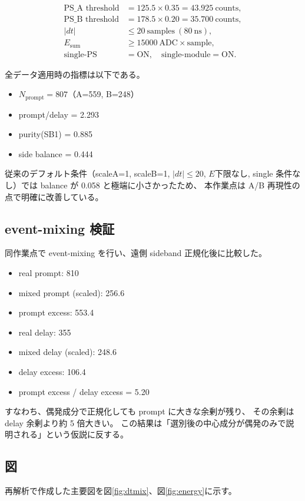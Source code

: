 \documentclass[a4paper,11pt]{jsarticle}
\begin{document}
\begin{align}
\text{PS\_A threshold} &= 125.5 \times 0.35 = 43.925 \ \mathrm{counts}, \\
\text{PS\_B threshold} &= 178.5 \times 0.20 = 35.700 \ \mathrm{counts}, \\
|dt| &\le 20 \ \text{samples} \ (80\ \mathrm{ns}), \\
E_{\mathrm{sum}} &\ge 15000 \ \mathrm{ADC\times sample}, \\
\text{single-PS} &= \text{ON},\quad \text{single-module}=\text{ON}.
\end{align}

全データ適用時の指標は以下である。
\begin{itemize}
  \item $N_{\mathrm{prompt}}=807$（A=559, B=248）
  \item prompt/delay = 2.293
  \item purity(SB1) = 0.885
  \item side balance = 0.444
\end{itemize}

従来のデフォルト条件（scaleA=1, scaleB=1, $|dt|\le20$, $E$下限なし, single 条件なし）では
balance が 0.058 と極端に小さかったため、
本作業点は A/B 再現性の点で明確に改善している。

\subsection{event-mixing 検証}
同作業点で event-mixing を行い、遠側 sideband 正規化後に比較した。

\begin{itemize}
  \item real prompt: 810
  \item mixed prompt (scaled): 256.6
  \item prompt excess: 553.4
  \item real delay: 355
  \item mixed delay (scaled): 248.6
  \item delay excess: 106.4
  \item prompt excess / delay excess = 5.20
\end{itemize}

すなわち、偶発成分で正規化しても prompt に大きな余剰が残り、
その余剰は delay 余剰より約 5 倍大きい。
この結果は「選別後の中心成分が偶発のみで説明される」という仮説に反する。

\subsection{図}
再解析で作成した主要図を図\ref{fig:dtmix}、図\ref{fig:energy}に示す。
\end{document}
